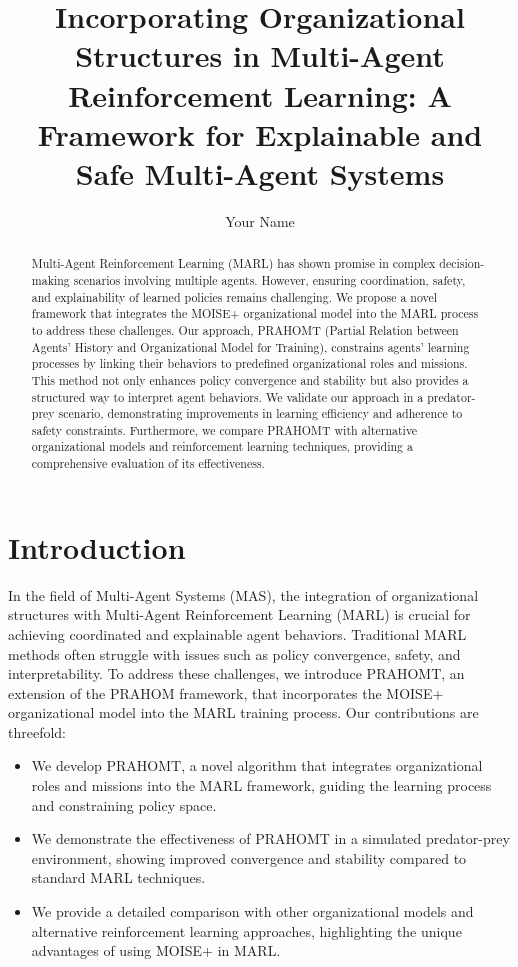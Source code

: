 \documentclass{article}
\title{Incorporating Organizational Structures in Multi-Agent Reinforcement Learning: A Framework for Explainable and Safe Multi-Agent Systems}
\author{Your Name}
\begin{document}
\maketitle

\begin{abstract}
Multi-Agent Reinforcement Learning (MARL) has shown promise in complex decision-making scenarios involving multiple agents. However, ensuring coordination, safety, and explainability of learned policies remains challenging. We propose a novel framework that integrates the MOISE+ organizational model into the MARL process to address these challenges. Our approach, PRAHOMT (Partial Relation between Agents’ History and Organizational Model for Training), constrains agents' learning processes by linking their behaviors to predefined organizational roles and missions. This method not only enhances policy convergence and stability but also provides a structured way to interpret agent behaviors. We validate our approach in a predator-prey scenario, demonstrating improvements in learning efficiency and adherence to safety constraints. Furthermore, we compare PRAHOMT with alternative organizational models and reinforcement learning techniques, providing a comprehensive evaluation of its effectiveness.

\end{abstract}

\section{Introduction}
In the field of Multi-Agent Systems (MAS), the integration of organizational structures with Multi-Agent Reinforcement Learning (MARL) is crucial for achieving coordinated and explainable agent behaviors. Traditional MARL methods often struggle with issues such as policy convergence, safety, and interpretability. To address these challenges, we introduce PRAHOMT, an extension of the PRAHOM framework, that incorporates the MOISE+ organizational model into the MARL training process. Our contributions are threefold:
\begin{itemize}
    \item We develop PRAHOMT, a novel algorithm that integrates organizational roles and missions into the MARL framework, guiding the learning process and constraining policy space.
    \item We demonstrate the effectiveness of PRAHOMT in a simulated predator-prey environment, showing improved convergence and stability compared to standard MARL techniques.
    \item We provide a detailed comparison with other organizational models and alternative reinforcement learning approaches, highlighting the unique advantages of using MOISE+ in MARL.
\end{itemize}
\end{document}

